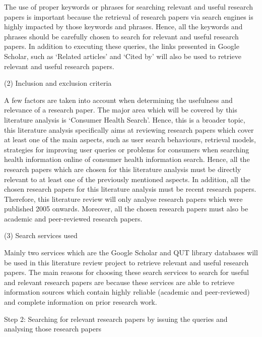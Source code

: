 \documentclass[]{article}
\begin{document}
The use of proper keywords or phrases for searching relevant and useful research papers is important because the retrieval of research papers via search engines is highly impacted by those keywords and phrases. Hence, all the keywords and phrases should be carefully chosen to search for relevant and useful research papers. In addition to executing these queries, the links presented in Google Scholar, such as ‘Related articles’ and ‘Cited by’ will also be used to retrieve relevant and useful research papers.   
	
(2)	Inclusion and exclusion criteria 
	
A few factors are taken into account when determining the usefulness and relevance of a research paper. The major area which will be covered by this literature analysis is ‘Consumer Health Search’. Hence, this is a broader topic, this literature analysis specifically aims at reviewing research papers which cover at least one of the main aspects, such as user search behaviours, retrieval models, strategies for improving user queries or problems for consumers when searching health information online of consumer health information search. Hence, all the research papers which are chosen for this literature analysis must be directly relevant to at least one of the previously mentioned aspects. In addition, all the chosen research papers for this literature analysis must be recent research papers. Therefore, this literature review will only analyse research papers which were published 2005 onwards. Moreover, all the chosen research papers must also be academic and peer-reviewed research papers. 
	
(3)	Search services used
	
Mainly two services which are the Google Scholar and QUT library databases will be used in this literature review project to retrieve relevant and useful research papers. The main reasons for choosing these search services to search for useful and relevant research papers are because these services are able to retrieve information sources which contain highly reliable (academic and peer-reviewed) and complete information on prior research work.   
	
Step 2: Searching for relevant research papers by issuing the queries and analysing those research papers  
	
\end{document}
